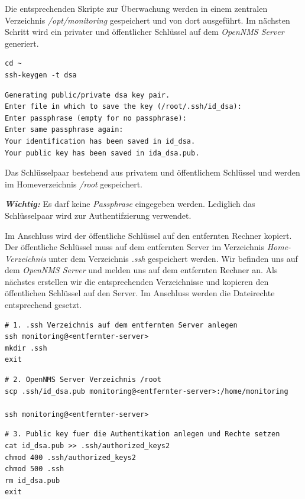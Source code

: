 Die entsprechenden Skripte zur Überwachung werden in einem zentralen Verzeichnis \emph{/opt/monitoring} gespeichert und von dort ausgeführt. Im nächsten Schritt wird ein privater und öffentlicher Schlüssel auf dem \emph{OpenNMS Server} generiert.

\begin{lstlisting}[numbers=none]
cd ~
ssh-keygen -t dsa
\end{lstlisting}

\begin{lstlisting}
Generating public/private dsa key pair.
Enter file in which to save the key (/root/.ssh/id_dsa):
Enter passphrase (empty for no passphrase): 
Enter same passphrase again: 
Your identification has been saved in id_dsa.
Your public key has been saved in ida_dsa.pub.
\end{lstlisting}

Das Schlüsselpaar bestehend aus privatem und öffentlichem Schlüssel und werden im Homeverzeichnis \emph{/root} gespeichert.

\textbf{\textit{Wichtig:}} Es darf keine \emph{Passphrase} eingegeben werden. Lediglich das Schlüsselpaar wird zur Authentifzierung verwendet.

Im Anschluss wird der öffentliche Schlüssel auf den entfernten Rechner kopiert. Der öffentliche Schlüssel muss auf dem entfernten Server im Verzeichnis \emph{Home-Verzeichnis} unter dem Verzeichnis \emph{.ssh} gespeichert werden. Wir befinden uns auf dem \emph{OpenNMS Server} und melden uns auf dem entfernten Rechner an. Als nächstes erstellen wir die entsprechenden Verzeichnisse und kopieren den öffentlichen Schlüssel auf den Server. Im Anschluss werden die Dateirechte entsprechend gesetzt.

\begin{lstlisting}[numbers=none]
# 1. .ssh Verzeichnis auf dem entfernten Server anlegen
ssh monitoring@<entfernter-server>
mkdir .ssh
exit
\end{lstlisting}

\begin{lstlisting}[numbers=none]
# 2. OpenNMS Server Verzeichnis /root
scp .ssh/id_dsa.pub monitoring@<entfernter-server>:/home/monitoring

ssh monitoring@<entfernter-server>
\end{lstlisting}

\begin{lstlisting}[numbers=none]
# 3. Public key fuer die Authentikation anlegen und Rechte setzen
cat id_dsa.pub >> .ssh/authorized_keys2
chmod 400 .ssh/authorized_keys2
chmod 500 .ssh
rm id_dsa.pub
exit
\end{lstlisting}


